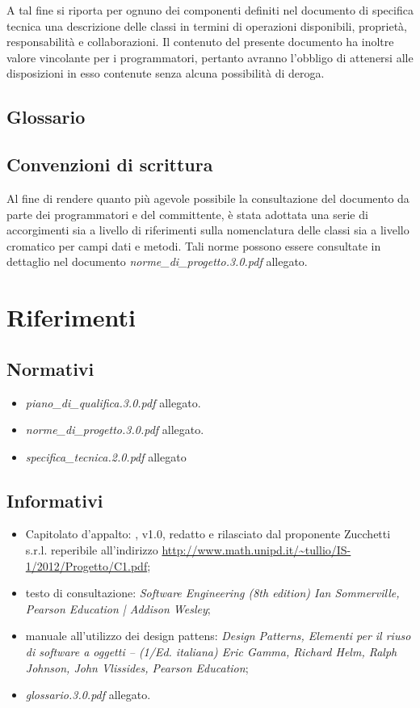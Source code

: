 A tal fine si riporta per ognuno dei componenti definiti nel documento di specifica tecnica una descrizione delle classi in termini di operazioni disponibili, proprietà, responsabilità e collaborazioni. Il contenuto del presente documento ha inoltre valore vincolante per i programmatori, pertanto avranno l'obbligo di attenersi alle disposizioni in esso contenute senza alcuna possibilità di deroga.

\subsection{Glossario}
\glossaryIntro

\subsection{Convenzioni di scrittura}
Al fine di rendere quanto più agevole possibile la consultazione del documento da parte dei programmatori e del committente, è stata adottata una serie di accorgimenti sia a livello di riferimenti sulla nomenclatura delle classi sia a livello cromatico per campi dati e metodi. 
Tali norme possono essere consultate in dettaglio nel documento \textit{norme\_di\_progetto.3.0.pdf} allegato.
\clearpage

\section{Riferimenti}
\subsection{Normativi}
\begin{itemize}
\item[] \textit{piano\_di\_qualifica.3.0.pdf} allegato.
\item[] \textit{norme\_di\_progetto.3.0.pdf} allegato.
\item[] \textit{specifica\_tecnica.2.0.pdf} allegato
\end{itemize}

\subsection{Informativi}
\begin{itemize}
\item[] Capitolato d'appalto: \caName{}, v1.0, redatto e rilasciato dal proponente Zucchetti s.r.l. reperibile all'indirizzo \url{http://www.math.unipd.it/~tullio/IS-1/2012/Progetto/C1.pdf};
\item[] testo di consultazione: \textit{Software Engineering (8th edition) Ian Sommerville, Pearson Education | Addison Wesley};
\item[] manuale all'utilizzo dei design pattens: \textit{Design Patterns, Elementi per il riuso di software a oggetti -- (1/Ed. italiana) Eric Gamma, Richard Helm, Ralph Johnson, John Vlissides, Pearson Education};
\item[] \textit{glossario.3.0.pdf} allegato.
\end{itemize}
\clearpage

